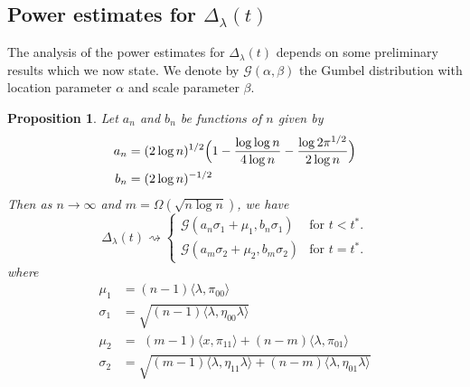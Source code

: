 \documentclass[draftcls]{IEEEtran}
\newtheorem{proposition}[theorem]{Proposition}
\theoremstyle{definition}
\begin{document}
\subsection{Power estimates for $\Delta_{\lambda}(t)$}
The analysis of the power estimates for $\Delta_{\lambda}(t)$ depends
on some preliminary results which we now state. We denote by
$\mathcal{G}(\alpha, \beta)$ the Gumbel distribution with location
parameter $\alpha$ and scale parameter $\beta$.  
\begin{proposition}
  \label{prop:3}
  Let $a_n$ and $b_n$ be functions of $n$ given by
  \begin{align*}
    a_n &= (2 \log{n})^{1/2}\Bigl(1 - \frac{\log{\log{n}}}{4 \log{n}} -
    \frac{\log{2\pi^{1/2}}}{2 \log{n}} \Bigr) \\ 
    b_n &= (2 \log{n})^{-1/2}
  \end{align*}
  Then as $n \rightarrow \infty$ and $m = \Omega( \sqrt{n \log{n}})$,
  we have
  \begin{equation}
    \label{eq:6}
    \Delta_{\lambda}(t) \rightsquigarrow \begin{cases}
      \mathcal{G}(a_n \sigma_1 + \mu_1, b_n \sigma_1 ) & \text{for $t < t^{*}$.} \\
     \mathcal{G}(a_m \sigma_2 + \mu_2, b_m \sigma_2) &
     \text{for $t = t^{*}$.}
     \end{cases}
  \end{equation}
  where
  \begin{align*}
    \mu_1 &= (n-1)\langle \lambda, \pi_{00} \rangle \\
    \sigma_1 &= \sqrt{(n-1)\langle \lambda, \eta_{00} \lambda \rangle} \\
    \mu_2 &= \,\, (m - 1) \langle x, \pi_{11} \rangle + (n-
    m)\langle \lambda, \pi_{01} \rangle
    \\ \sigma_2 &= \sqrt{ (m - 1) \langle \lambda, \eta_{11} \lambda \rangle + (n -
      m) \langle \lambda, \eta_{01} \lambda \rangle}
    \end{align*}
\end{proposition}
\end{document}
